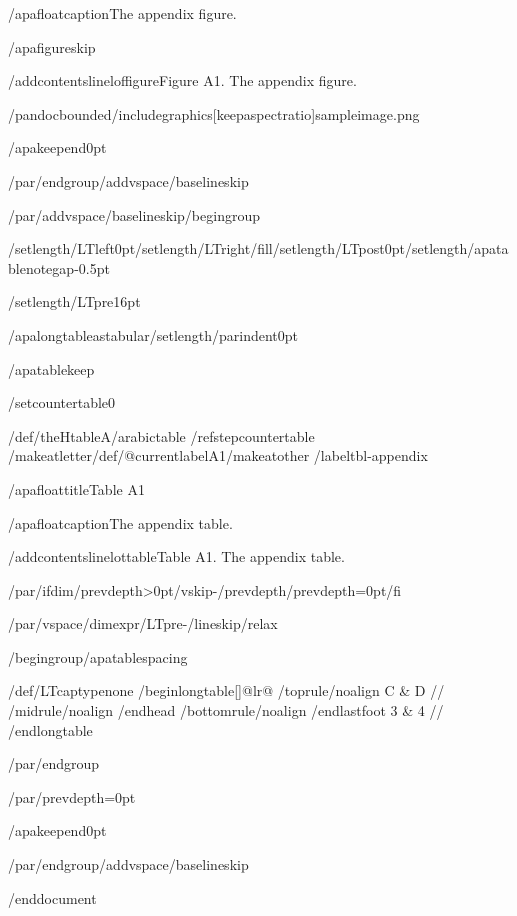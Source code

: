 /apafloatcaption{The appendix figure.}

/apafigureskip

/addcontentsline{lof}{figure}{Figure A1. The appendix figure.}

/pandocbounded{/includegraphics[keepaspectratio]{sampleimage.png}}

/apakeepend{0pt}

/par/endgroup/addvspace{/baselineskip}

/par/addvspace{/baselineskip}/begingroup

/setlength{/LTleft}{0pt}/setlength{/LTright}{/fill}/setlength{/LTpost}{0pt}/setlength{/apatablenotegap}{-0.5pt}

/setlength{/LTpre}{16pt}

/apalongtableastabular/setlength{/parindent}{0pt}

/apatablekeep

/setcounter{table}{0}

/def/theHtable{A/arabic{table}}%
/refstepcounter{table}%
/makeatletter/def/@currentlabel{A1}/makeatother%
/label{tbl-appendix}

/apafloattitle{Table A1}

/apafloatcaption{The appendix table.}

/addcontentsline{lot}{table}{Table A1. The appendix table.}

/par/ifdim/prevdepth>0pt/vskip-/prevdepth/prevdepth=0pt/fi

/par/vspace{/dimexpr/LTpre-/lineskip/relax}

/begingroup/apatablespacing

{/def/LTcaptype{none} %
/begin{longtable}[]{@{}lr@{}}
/toprule/noalign{}
C & D //
/midrule/noalign{}
/endhead
/bottomrule/noalign{}
/endlastfoot
3 & 4 //
/end{longtable}
}

/par/endgroup

/par/prevdepth=0pt

/apakeepend{0pt}

/par/endgroup/addvspace{/baselineskip}




/end{document}

